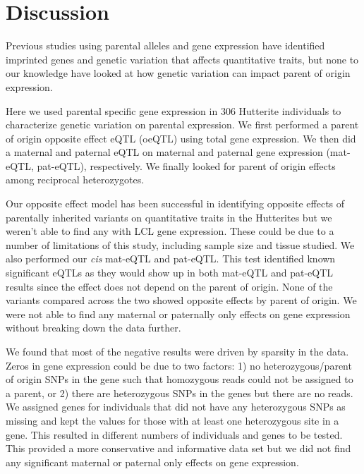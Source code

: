 \section{Discussion}\label{ch04-discussion}

Previous studies using parental alleles and gene expression have identified imprinted genes and genetic variation that affects quantitative traits\cite{Zoledziewska:2015do,Baran:2015cx,Benonisdottir:2016dz,Garg2012a}, but none to our knowledge have looked at how genetic variation can impact parent of origin expression.

Here we used parental specific gene expression in 306 Hutterite individuals to characterize genetic variation on parental expression. We first performed a parent of origin opposite effect eQTL (oeQTL) using total gene expression. We then did a maternal and paternal eQTL on maternal and paternal gene expression (mat-eQTL, pat-eQTL), respectively. We finally looked for parent of origin effects among reciprocal heterozygotes.

Our opposite effect model has been successful in identifying opposite effects of parentally inherited variants on quantitative traits in the Hutterites but we weren't able to find any with LCL gene expression. These could be due to a number of limitations of this study, including sample size and tissue studied. We also performed our \emph{cis} mat-eQTL and pat-eQTL. This test identified known significant eQTLs as they would show up in both mat-eQTL and pat-eQTL results since the effect does not depend on the parent of origin. None of the variants compared across the two showed opposite effects by parent of origin. We were not able to find any maternal or paternally only effects on gene expression without breaking down the data further.

We found that most of the negative results were driven by sparsity in the data. Zeros in gene expression could be due to two factors: 1) no heterozygous/parent of origin SNPs in the gene such that homozygous reads could not be assigned to a parent, or 2) there are heterozygous SNPs in the genes but there are no reads. We assigned genes for individuals that did not have any heterozygous SNPs as missing and kept the values for those with at least one heterozygous site in a gene. This resulted in different numbers of individuals and genes to be tested. This provided a more conservative and informative data set but we did not find any significant maternal or paternal only effects on gene expression.

